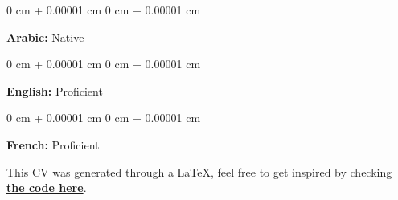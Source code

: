 \documentclass[10pt, letterpaper]{article}
\newenvironment{onecolentry}{ \begin{adjustwidth}{ 0 cm + 0.00001 cm }{ 0 cm + 0.00001 cm }
}{ \end{adjustwidth} } %
\begin{document}
\begin{onecolentry}
	\textbf{Arabic:} Native
\end{onecolentry}

\vspace{0.2 cm}

\begin{onecolentry}
	\textbf{English:} Proficient
\end{onecolentry}

\vspace{0.2 cm}
\begin{onecolentry}
	\textbf{French:} Proficient
\end{onecolentry}

\vspace*{\fill}

{\small This CV was generated through a LaTeX, feel free to get inspired by checking {\href{https://github.com/wadhah101/mycv/}{\textbf{the code here}}}.}
\end{document}
